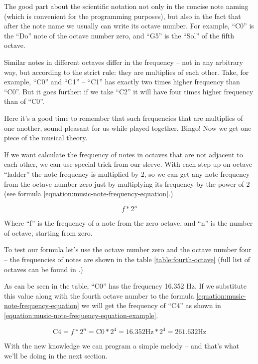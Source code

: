 \documentclass[../sparc.tex]{subfiles}
\begin{document}
The good part about the scientific notation not only in the concise note naming
(which is convenient for the programming purposes), but also in the fact that
after the note name we usually can write its octave number.  For example, ``C0''
is the ``Do'' note of the octave number zero, and ``G5'' is the ``Sol'' of the
fifth octave.

Similar notes in different octaves differ in the frequency -- not in any
arbitrary way, but according to the strict rule: they are multiplies of each
other.  Take, for example, ``C0'' and ``C1'' -- ``C1'' has exactly two times
higher frequency than ``C0''.  But it goes further: if we take ``C2'' it will
have four times higher frequency than of ``C0''.

Here it's a good time to remember that such frequencies that are multiplies of
one another, sound pleasant for us while played together.  Bingo!  Now we get
one piece of the musical theory.

If we want calculate the frequency of notes in octaves that are not adjacent to
each other, we can use special trick from our sleeve.  With each step up on
octave ``ladder'' the note frequency is multiplied by 2, so we can get any note
frequency from the octave number zero just by multiplying its frequency by the
power of 2 (see formula \ref{equation:music-note-frequency-equation}.)

\begin{equation}
  f * 2^n
  \label{equation:music-note-frequency-equation}
\end{equation}

Where ``f'' is the frequency of a note from the zero octave, and ``n'' is the
number of octave, starting from zero.

To test our formula let's use the octave number zero and the octave number four
-- the frequencies of notes are shown in the table \ref{table:fourth-octave}
(full list of octaves can be found in .)


As can be seen in the table, ``C0'' has the frequency 16.352 Hz.  If we
substitute this value along with the fourth octave number to the formula
\ref{equation:music-note-frequency-equation} we will get the frequency of ``C4''
as shown in \ref{equation:music-note-frequency-equation-example}.

\begin{equation}
  \mbox{C4} = f * 2^n = \mbox{C0} * 2^4 = 16.352\mbox{Hz} * 2^4 = 261.632\mbox{Hz}
  \label{equation:music-note-frequency-equation-example}
\end{equation}

With the new knowledge we can program a simple melody -- and that's what we'll be
doing in the next section.
\end{document}
